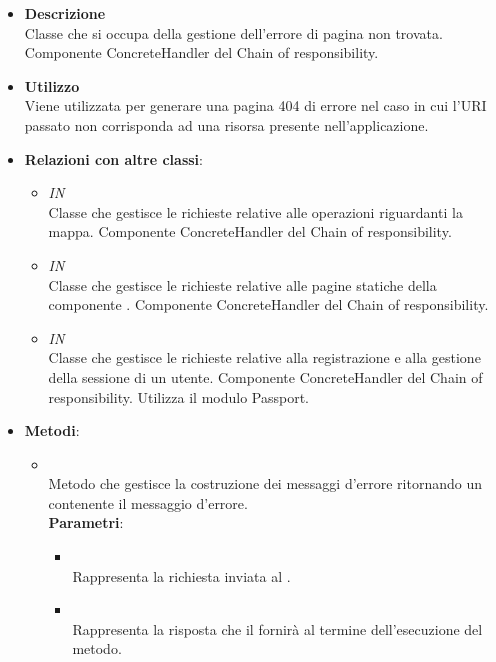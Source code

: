 \begin{itemize}
\item \textbf{Descrizione}\\
Classe che si occupa della gestione dell'errore di pagina non trovata. Componente
ConcreteHandler del  Chain of responsibility.
\item \textbf{Utilizzo}\\
Viene utilizzata per generare una pagina 404 di errore nel caso in cui l'URI passato non corrisponda ad una risorsa presente nell'applicazione.
\item \textbf{Relazioni con altre classi}:
\begin{itemize}
\item \textit{IN} \hyperref[\nogloxy{Premi::Back-End::App::Routers::ProjectRouter}]{}\\
Classe che gestisce le richieste relative alle operazioni riguardanti la mappa.  Componente ConcreteHandler del  Chain of responsibility.
\item \textit{IN} \hyperref[\nogloxy{Premi::Back-End::App::Routers::StaticRouter}]{}\\
Classe che gestisce le richieste relative alle pagine statiche della componente . Componente ConcreteHandler del  Chain of responsibility.
\item \textit{IN} \hyperref[\nogloxy{Premi::Back-End::App::Routers::UserRouter}]{}\\
Classe che gestisce le richieste relative alla registrazione e alla gestione della sessione di un utente. Componente ConcreteHandler del  Chain of responsibility. Utilizza il modulo Passport.
\end{itemize}
\item \textbf{Metodi}:
\begin{itemize}
\item {}
\\ Metodo che gestisce la costruzione dei messaggi d’errore ritornando un  contenente il messaggio d'errore.
\\ \textbf{Parametri}:
\begin{itemize}
\item {}
\\ Rappresenta la richiesta inviata al .
\item {}
\\ Rappresenta la risposta che il  fornirà al termine dell’esecuzione del metodo.
\end{itemize}
\end{itemize}
\end{itemize}

